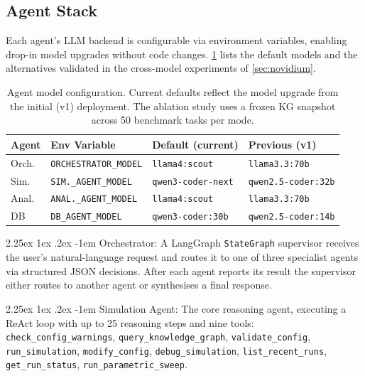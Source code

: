 \documentclass[preprint,review,12pt]{elsarticle}
\makeatletter
\renewcommand\paragraph{\@startsection{paragraph}{4}{\z@}%
  {2.25ex \@plus1ex \@minus.2ex}%
  {-1em}%
  {\normalfont\normalsize\bfseries}}
\makeatother
\begin{document}
\subsection{Agent Stack}

Each agent's LLM backend is configurable via environment variables,
enabling drop-in model upgrades without code changes.
\cref{tab:agent-models} lists the default models and the alternatives
validated in the cross-model experiments of \cref{sec:novidium}.

\begin{table}[h]
\centering\scriptsize
\caption{Agent model configuration.  Current defaults reflect the
  model upgrade from the initial (v1) deployment.  The ablation study uses a frozen KG snapshot
  across 50 benchmark tasks per mode.}
\label{tab:agent-models}
\setlength{\tabcolsep}{2.5pt}
\begin{tabular}{@{}llll@{}}
\toprule
Agent & Env Variable & Default (current) & Previous (v1) \\
\midrule
Orch.  & \texttt{ORCHESTRATOR\_MODEL} & \texttt{llama4:scout} & \texttt{llama3.3:70b} \\
Sim.   & \texttt{SIM.\_AGENT\_MODEL} & \texttt{qwen3-coder-next} & \texttt{qwen2.5-coder:32b} \\
Anal.  & \texttt{ANAL.\_AGENT\_MODEL} & \texttt{llama4:scout} & \texttt{llama3.3:70b} \\
DB     & \texttt{DB\_AGENT\_MODEL} & \texttt{qwen3-coder:30b} & \texttt{qwen2.5-coder:14b} \\
\bottomrule
\end{tabular}
\end{table}

\paragraph{Orchestrator:}
A LangGraph \texttt{StateGraph} supervisor receives the user's
natural-language request and routes it to one of three specialist agents via
structured JSON decisions.  After each agent reports its result the
supervisor either routes to another agent or synthesises a final response.

\paragraph{Simulation Agent:}
The core reasoning agent, executing a ReAct loop \citep{yao2023react}
with up to 25 reasoning steps and nine tools:
\texttt{check\_config\_warnings},
\texttt{query\_knowledge\_graph},
\texttt{validate\_config},
\texttt{run\_simulation},
\texttt{modify\_config},
\texttt{debug\_simulation},
\texttt{list\_recent\_runs},
\texttt{get\_run\_status},
\texttt{run\_parametric\_sweep}.
\end{document}

